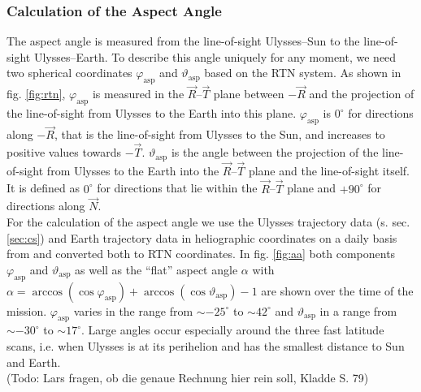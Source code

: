 \subsubsection{Calculation of the Aspect Angle}
The aspect angle is measured from the line-of-sight Ulysses--Sun to the line-of-sight Ulysses--Earth. To describe this angle uniquely for any moment, we need two spherical coordinates $\varphi_{\mathrm{asp}}$ and $\vartheta_{\mathrm{asp}}$ based on the RTN system. As shown in fig. \ref{fig:rtn}, $\varphi_{\mathrm{asp}}$ is measured in the $\vec{R}$--$\vec{T}$ plane between $-\vec{R}$ and the projection of the line-of-sight from Ulysses to the Earth into this plane. $\varphi_{\mathrm{asp}}$  is $0^\circ$ for directions along $-\vec{R}$, that is the line-of-sight from Ulysses to the Sun, and increases to positive values towards $-\vec{T}$. $\vartheta_{\mathrm{asp}}$ is the angle between the projection of the line-of-sight from Ulysses to the Earth into the $\vec{R}$--$\vec{T}$ plane and the line-of-sight itself. It is defined as $0^\circ$ for directions that lie within the $\vec{R}$--$\vec{T}$ plane and $+90^\circ$ for directions along $\vec{N}$.\\
For the calculation of the aspect angle we use the Ulysses trajectory data (s. sec. \ref{sec:cs}) and Earth trajectory data in heliographic coordinates on a daily basis from \citet{nasa-earth-coord} and converted both to RTN coordinates. In fig. \ref{fig:aa} both components $\varphi_{\mathrm{asp}}$ and $\vartheta_{\mathrm{asp}}$ as well as the ``flat'' aspect angle $\alpha$ with  $\alpha = \arccos(\cos{\varphi_{\mathrm{asp}}}) + \arccos(\cos{\vartheta_{\mathrm{asp}}}) -1$ are shown over the time of the mission. $\varphi_{\mathrm{asp}}$ varies in the range from $\sim - 25^\circ$ to $\sim 42^\circ$ and $\vartheta_{\mathrm{asp}}$ in a range from $\sim - 30^\circ$ to $\sim 17^\circ$. Large angles occur especially around the three fast latitude scans, i.e. when Ulysses is at its perihelion and has the smallest distance to Sun and Earth.\\
(Todo: Lars fragen, ob die genaue Rechnung hier rein soll, Kladde S. 79)
